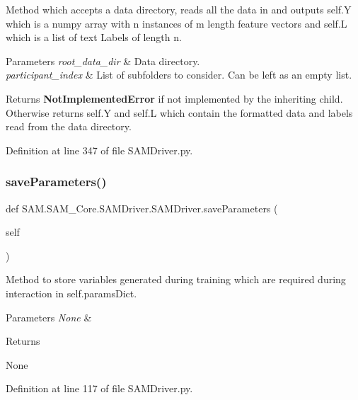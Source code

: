 Method which accepts a data directory, reads all the data in and outputs self.\+Y which is a numpy array with n instances of m length feature vectors and self.\+L which is a list of text Labels of length n. 


\begin{DoxyParams}{Parameters}
{\em root\+\_\+data\+\_\+dir} & Data directory. \\
\hline
{\em participant\+\_\+index} & List of subfolders to consider. Can be left as an empty list.\\
\hline
\end{DoxyParams}
\begin{DoxyReturn}{Returns}
{\bfseries Not\+Implemented\+Error} if not implemented by the inheriting child. Otherwise returns self.\+Y and self.\+L which contain the formatted data and labels read from the data directory. 
\end{DoxyReturn}


Definition at line 347 of file S\+A\+M\+Driver.\+py.

\mbox{\label{group__icubclient__SAM__Drivers_gac6f300d2daf748b11b28802574b6f5e8}} 
\subsubsection{\texorpdfstring{save\+Parameters()}{saveParameters()}}
{\footnotesize\ttfamily def S\+A\+M.\+S\+A\+M\+\_\+\+Core.\+S\+A\+M\+Driver.\+S\+A\+M\+Driver.\+save\+Parameters (\begin{DoxyParamCaption}\item[{}]{self }\end{DoxyParamCaption})}



Method to store variables generated during training which are required during interaction in self.\+params\+Dict. 


\begin{DoxyParams}{Parameters}
{\em None} & \\
\hline
\end{DoxyParams}
\begin{DoxyReturn}{Returns}


None 
\end{DoxyReturn}


Definition at line 117 of file S\+A\+M\+Driver.\+py.

